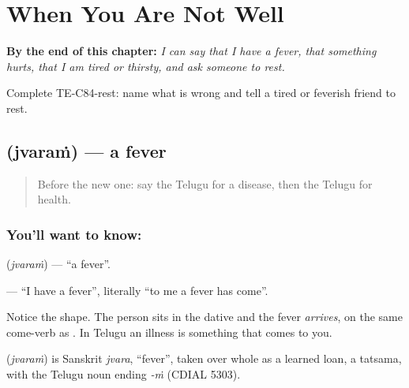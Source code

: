 
\chapter{When You Are Not Well}
\label{ch:te-not-well}

\begin{chapteropening}
\textbf{By the end of this chapter:} \emph{I can say that I have a fever, that something hurts, that I am tired or thirsty, and ask someone to rest.}

Complete TE-C84-rest: name what is wrong and tell a tired or feverish friend to rest.
\end{chapteropening}

\section[\texorpdfstring{\te{జ్వరం} (jvaraṁ)}{జ్వరం (jvaraṁ)}]{ (jvaraṁ) — a fever}

\label{lesson:TE-C84-fever}



\begin{quote}
Before the new one: say the Telugu for a disease, then the Telugu for health.
\end{quote}

\subsection*{You'll want to know: }
\textbf{} (\emph{jvaraṁ}) — \textquotedblleft{}a fever\textquotedblright{}.

\textbf{  } — \textquotedblleft{}I have a fever\textquotedblright{}, literally \textquotedblleft{}to me a fever has come\textquotedblright{}.

Notice the shape. The person sits in the dative  and the fever \emph{arrives}, on the same come-verb as \textbf{  }. In Telugu an illness is something that comes to you.

\begin{cousinweb}
\textbf{} (\emph{jvaraṁ}) is Sanskrit \emph{jvara}, \textquotedblleft{}fever\textquotedblright{}, taken over whole as a learned loan, a tatsama, with the Telugu noun ending \emph{-ṁ} (CDIAL 5303).
\end{cousinweb}

